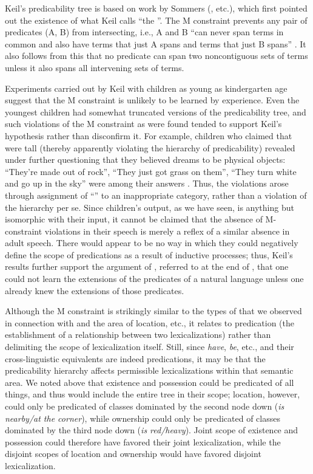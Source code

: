 Keil's predicability tree is based on work by Sommers (\citeyear{Sommers1959,Sommers1963}, etc.), which first pointed out the existence of what Keil calls ``the ''. The M constraint prevents any pair of predicates (A, B) from intersecting, i.e., A and B ``can never span terms in common and also have terms that just A spans and terms that just B spans'' \citep[16]{Keil1979}. It also follows from this that no predicate can span two noncontiguous sets of terms unless it also spans all intervening sets of terms.

Experiments carried out by Keil with children as young as kindergarten age suggest that the M constraint is unlikely to be learned by experience. Even the youngest children had somewhat truncated versions of the predicability tree, and such violations of the M constraint as were found tended to support Keil's hypothesis rather than disconfirm it. For example, children who claimed that  were tall (thereby apparently violating the hierarchy of predicability) revealed under further questioning that they believed dreams to be physical objects: ``They're made out of rock'', ``They just got grass on them'', ``They turn white and go up in the sky'' were among their answers \citep[110]{Keil1979}. Thus, the violations arose through assignment of ``'' to an inappropriate category, rather than a violation of the hierarchy per se. Since children's output, as we have seen, is anything but isomorphic with their input, it cannot be claimed that the absence of M-constraint violations in their speech is merely a reflex of a similar absence in adult speech. There would appear to be no way in which they could negatively define the scope of predications as a result of inductive processes; thus, Keil's results further support the argument of \citet{Fodor1975}, referred to at the end of , that one could not learn the extensions of the predicates of a natural language unless one already knew the extensions of those predicates.

Although the M constraint is strikingly similar to the types of  that we observed in connection with  and the area of location, etc., it relates to predication (the
establishment of a relationship between two lexicalizations) rather than delimiting the scope of lexicalization itself. Still, since \textit{have}, \textit{be}, etc., and their cross-linguistic equivalents are indeed predications, it may be that the predicability hierarchy affects permissible lexicalizations within that semantic area. We noted above that existence and possession could be predicated of all things, and thus would include the entire tree in their scope; location, however, could only be predicated of classes dominated by the second node down (\textit{is nearby/at the corner}), while ownership could only be predicated of classes dominated by the third node down (\textit{is red/heavy}). Joint scope of existence and possession could therefore have favored their joint lexicalization, while the disjoint scopes of location and ownership would have favored disjoint lexicalization.

